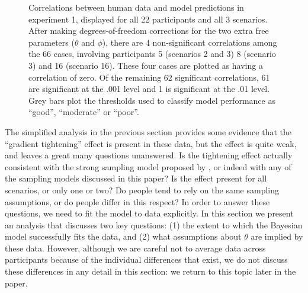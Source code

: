 \documentclass[doc]{apa6}
\begin{document}
\begin{figure}[t]
\begin{center}
\caption{Correlations between human data and model predictions in experiment 1, displayed for all 22 participants and all 3 scenarios. After making degrees-of-freedom corrections for the two extra free parameters ($\theta$ and $\phi$), there are 4 non-significant correlations among the 66 cases, involving participants 5 (scenarios 2 and 3) 8 (scenario 3) and 16 (scenario 16). These four cases are plotted as having a correlation of zero. Of the remaining 62 significant correlations, 61 are significant at the .001 level and 1 is significant at the .01 level. Grey bars plot the thresholds used to classify model performance as ``good'', ``moderate'' or ``poor''.}
\label{correl1}
\end{center}
\end{figure}


The simplified analysis in the previous section provides some evidence that the ``gradient tightening'' effect is present in these data, but the effect is quite weak, and leaves a great many questions unanswered. Is the tightening effect actually consistent with the strong sampling model proposed by , or indeed with any of the sampling models discussed in this paper? Is the effect present for all scenarios, or only one or two? Do people tend to rely on the same sampling assumptions, or do people differ in this respect? In order to answer these questions, we need to fit the model to data explicitly. In this section we present an analysis that discusses two key questions: (1) the extent to which the Bayesian model successfully fits the data, and (2) what assumptions about $\theta$ are implied by these data. However, although we are careful not to average data across participants because of the individual differences that exist, we do not discuss these differences in any detail in this section: we return to this topic later in the paper.
\end{document}
